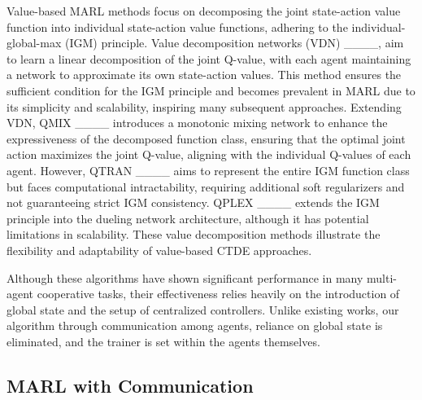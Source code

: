 Value-based MARL methods focus on decomposing the joint state-action value function into individual state-action value functions, adhering to the individual-global-max (IGM) principle. Value decomposition networks (VDN) ____, aim to learn a linear decomposition of the joint Q-value, with each agent maintaining a network to approximate its own state-action values. This method ensures the sufficient condition for the IGM principle and becomes prevalent in MARL due to its simplicity and scalability, inspiring many subsequent approaches. Extending VDN, QMIX ____ introduces a monotonic mixing network to enhance the expressiveness of the decomposed function class, ensuring that the optimal joint action maximizes the joint Q-value, aligning with the individual Q-values of each agent. However, QTRAN ____ aims to represent the entire IGM function class but faces computational intractability, requiring additional soft regularizers and not guaranteeing strict IGM consistency. QPLEX ____ extends the IGM principle into the dueling network architecture, although it has potential limitations in scalability. These value decomposition methods illustrate the flexibility and adaptability of value-based CTDE approaches.

Although these algorithms have shown significant performance in many multi-agent cooperative tasks, their effectiveness relies heavily on the introduction of global state and the setup of centralized controllers. Unlike existing works, our algorithm through communication among agents, reliance on global state is eliminated, and the trainer is set within the agents themselves.


\subsection{MARL with Communication}


